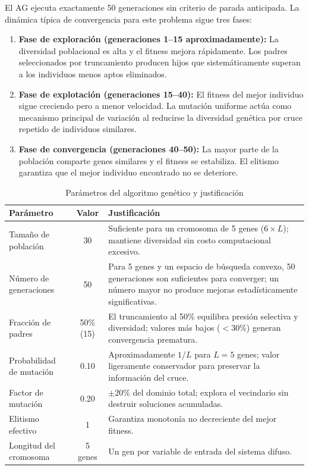 \documentclass[11pt]{article}
\begin{document}
El AG ejecuta exactamente 50 generaciones sin criterio de parada anticipada. La dinámica típica de convergencia para este problema sigue tres fases:

\begin{enumerate}
    \item \textbf{Fase de exploración (generaciones 1--15 aproximadamente):} La diversidad poblacional es alta y el fitness mejora rápidamente. Los padres seleccionados por truncamiento producen hijos que sistemáticamente superan a los individuos menos aptos eliminados.
    \item \textbf{Fase de explotación (generaciones 15--40):} El fitness del mejor individuo sigue creciendo pero a menor velocidad. La mutación uniforme actúa como mecanismo principal de variación al reducirse la diversidad genética por cruce repetido de individuos similares.
    \item \textbf{Fase de convergencia (generaciones 40--50):} La mayor parte de la población comparte genes similares y el fitness se estabiliza. El elitismo garantiza que el mejor individuo encontrado no se deteriore.
\end{enumerate}

\begin{table}[H]
    \centering
    \caption{Parámetros del algoritmo genético y justificación}
    \begin{tabular}{p{3.5cm}cp{7.5cm}}
        \toprule
        \textbf{Parámetro} & \textbf{Valor} & \textbf{Justificación} \\
        \midrule
        Tamaño de población & 30 & Suficiente para un cromosoma de 5 genes ($6\times L$); mantiene diversidad sin costo computacional excesivo. \\
        Número de generaciones & 50 & Para 5 genes y un espacio de búsqueda convexo, 50 generaciones son suficientes para converger; un número mayor no produce mejoras estadísticamente significativas. \\
        Fracción de padres & 50\% (15) & El truncamiento al 50\% equilibra presión selectiva y diversidad; valores más bajos ($<30\%$) generan convergencia prematura. \\
        Probabilidad de mutación & 0.10 & Aproximadamente $1/L$ para $L=5$ genes; valor ligeramente conservador para preservar la información del cruce. \\
        Factor de mutación & 0.20 & $\pm 20\%$ del dominio total; explora el vecindario sin destruir soluciones acumuladas. \\
        Elitismo efectivo & 1 & Garantiza monotonía no decreciente del mejor fitness. \\
        Longitud del cromosoma & 5 genes & Un gen por variable de entrada del sistema difuso. \\
        \bottomrule
    \end{tabular}
    \label{tab:parametros-ag}
    \par{}
\end{table}
\end{document}
